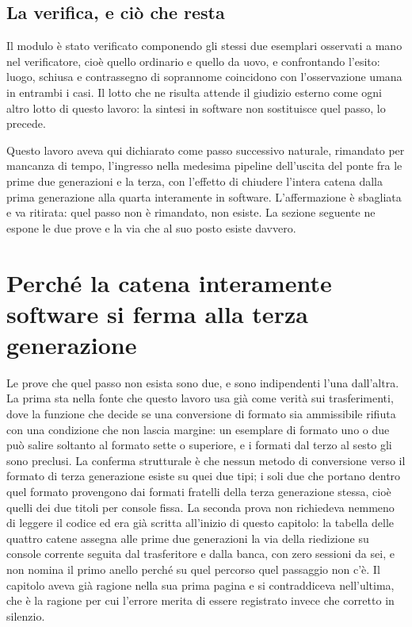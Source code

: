 \subsection{La verifica, e ciò che resta}

Il modulo è stato verificato componendo gli stessi due esemplari osservati a mano nel verificatore, cioè quello ordinario e quello da uovo, e confrontando l'esito: luogo, schiusa e contrassegno di soprannome coincidono con l'osservazione umana in entrambi i casi. Il lotto che ne risulta attende il giudizio esterno come ogni altro lotto di questo lavoro: la sintesi in software non sostituisce quel passo, lo precede.

Questo lavoro aveva qui dichiarato come passo successivo naturale, rimandato per mancanza di tempo, l'ingresso nella medesima pipeline dell'uscita del ponte fra le prime due generazioni e la terza, con l'effetto di chiudere l'intera catena dalla prima generazione alla quarta interamente in software. L'affermazione è sbagliata e va ritirata: quel passo non è rimandato, non esiste. La sezione seguente ne espone le due prove e la via che al suo posto esiste davvero.

\section{Perché la catena interamente software si ferma alla terza generazione}

Le prove che quel passo non esista sono due, e sono indipendenti l'una dall'altra. La prima sta nella fonte che questo lavoro usa già come verità sui trasferimenti, dove la funzione che decide se una conversione di formato sia ammissibile rifiuta con una condizione che non lascia margine: un esemplare di formato uno o due può salire soltanto al formato sette o superiore, e i formati dal terzo al sesto gli sono preclusi. La conferma strutturale è che nessun metodo di conversione verso il formato di terza generazione esiste su quei due tipi; i soli due che portano dentro quel formato provengono dai formati fratelli della terza generazione stessa, cioè quelli dei due titoli per console fissa. La seconda prova non richiedeva nemmeno di leggere il codice ed era già scritta all'inizio di questo capitolo: la tabella delle quattro catene assegna alle prime due generazioni la via della riedizione su console corrente seguita dal trasferitore e dalla banca, con zero sessioni da sei, e non nomina il primo anello perché su quel percorso quel passaggio non c'è. Il capitolo aveva già ragione nella sua prima pagina e si contraddiceva nell'ultima, che è la ragione per cui l'errore merita di essere registrato invece che corretto in silenzio.

